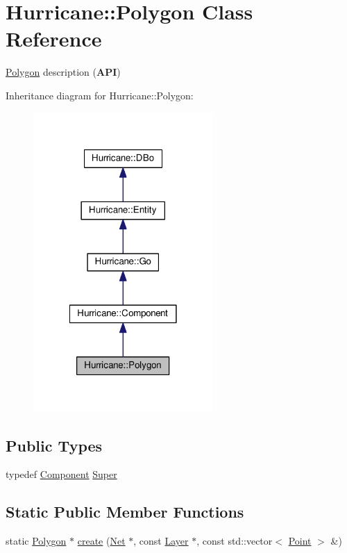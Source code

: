 \hypertarget{classHurricane_1_1Polygon}{}\section{Hurricane\+:\+:Polygon Class Reference}
\label{classHurricane_1_1Polygon}


\hyperlink{classHurricane_1_1Polygon}{Polygon} description ({\bfseries A\+PI})  




Inheritance diagram for Hurricane\+:\+:Polygon\+:\nopagebreak
\begin{figure}[H]
\begin{center}
\leavevmode
\includegraphics[width=194pt]{classHurricane_1_1Polygon__inherit__graph}
\end{center}
\end{figure}
\subsection*{Public Types}
\begin{DoxyCompactItemize}
\item 
typedef \hyperlink{classHurricane_1_1Component}{Component} \hyperlink{classHurricane_1_1Polygon_adac4dcd1480b81e7778775540b95f81c}{Super}
\end{DoxyCompactItemize}
\subsection*{Static Public Member Functions}
\begin{DoxyCompactItemize}
\item 
static \hyperlink{classHurricane_1_1Polygon}{Polygon} $\ast$ \hyperlink{classHurricane_1_1Polygon_ac248679558ff51bf509b28050027b7da}{create} (\hyperlink{classHurricane_1_1Net}{Net} $\ast$, const \hyperlink{classHurricane_1_1Layer}{Layer} $\ast$, const std\+::vector$<$ \hyperlink{classHurricane_1_1Point}{Point} $>$ \&)
\end{DoxyCompactItemize}
